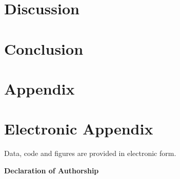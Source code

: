 \documentclass[12pt]{article}
\begin{document}
\section{Discussion}
\label{discussion}


\section{Conclusion}
\label{concl}


\newpage

    


\setcounter{page}{5}

\appendix

\section{Appendix}
\label{app}

\newpage

\section{Electronic Appendix}
\label{el_app}

Data, code and figures are provided in electronic form.

\newpage
    

\RaggedRight


\newpage


\Large
\noindent
\textbf{Declaration of Authorship} 
\vspace{0.5cm}
\noindent
\normalsize
\end{document}
